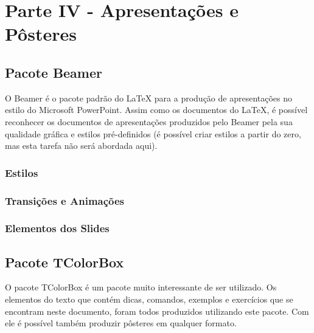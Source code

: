 \chapter{Parte IV - Apresentações e Pôsteres}
\label{cap:parteIV}

\section{Pacote Beamer}
\label{sec:beamer}

O Beamer é o pacote padrão do \LaTeX{} para a produção de apresentações no estilo do Microsoft PowerPoint. Assim como os documentos do \LaTeX{}, é possível reconhecer os documentos de apresentações produzidos pelo Beamer pela sua qualidade gráfica e estilos pré-definidos (é possível criar estilos a partir do zero, mas esta tarefa não será abordada aqui).

\subsection{Estilos}
\label{sec:estilos}

\subsection{Transições e Animações}
\label{sec:trans_anima}

\subsection{Elementos dos Slides}
\label{sec:elem_slides}

\section{Pacote TColorBox}
\label{sec:tcolorbox}

O pacote TColorBox é um pacote muito interessante de ser utilizado. Os elementos do texto que contém dicas, comandos, exemplos e exercícios que se encontram neste documento, foram todos produzidos utilizando este pacote. Com ele é possível também produzir pôsteres em qualquer formato.


